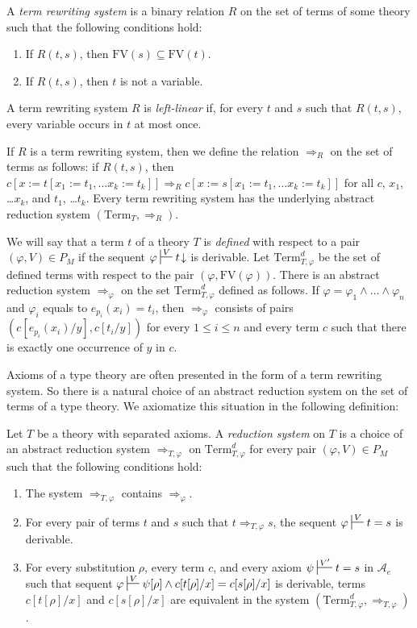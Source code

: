 \documentclass[reqno]{amsart}
\theoremstyle{definition}
\theoremstyle{remark}
\newcommand{\repl}{:=}
\newcommand{\Term}{\mathrm{Term}}
\newcommand{\FV}{\mathrm{FV}}
\numberwithin{figure}{section}
\begin{document}
A \emph{term rewriting system} is a binary relation $R$ on the set of terms of some theory such that the following conditions hold:
\begin{enumerate}
\item If $R(t,s)$, then $\FV(s) \subseteq \FV(t)$.
\item If $R(t,s)$, then $t$ is not a variable.
\end{enumerate}
A term rewriting system $R$ is \emph{left-linear} if, for every $t$ and $s$ such that $R(t,s)$, every variable occurs in $t$ at most once.

If $R$ is a term rewriting system, then we define the relation $\Rightarrow_R$ on the set of terms as follows:
if $R(t,s)$, then $c[x \repl t[x_1 \repl t_1, \ldots x_k \repl t_k]] \Rightarrow_R c[x \repl s[x_1 \repl t_1, \ldots x_k \repl t_k]]$ for all $c$, $x_1$, \ldots $x_k$, and $t_1$, \ldots $t_k$.
Every term rewriting system has the underlying abstract reduction system $(\Term_T,\Rightarrow_R)$.

We will say that a term $t$ of a theory $T$ is \emph{defined} with respect to a pair $(\varphi,V) \in P_M$ if the sequent $\varphi \sststile{}{V} t\!\downarrow$ is derivable.
Let $\Term_{T,\varphi}^d$ be the set of defined terms with respect to the pair $(\varphi,\FV(\varphi))$.
There is an abstract reduction system $\Rightarrow_\varphi$ on the set $\Term_{T,\varphi}^d$ defined as follows.
If $\varphi = \varphi_1 \land \ldots \land \varphi_n$ and $\varphi_i$ equals to $e_{p_i}(x_i) = t_i$, then $\Rightarrow_\varphi$ consists of pairs $(c[e_{p_i}(x_i)/y],c[t_i/y])$
for every $1 \leq i \leq n$ and every term $c$ such that there is exactly one occurrence of $y$ in $c$.

Axioms of a type theory are often presented in the form of a term rewriting system.
So there is a natural choice of an abstract reduction system on the set of terms of a type theory.
We axiomatize this situation in the following definition:

\begin{defn}[directed]
Let $T$ be a theory with separated axioms.
A \emph{reduction system} on $T$ is a choice of an abstract reduction system $\Rightarrow_{T,\varphi}$ on $\Term^d_{T,\varphi}$ for every pair $(\varphi,V) \in P_M$ such that the following conditions hold:
\begin{enumerate}
\item \label{it:dir-zero} The system $\Rightarrow_{T,\varphi}$ contains $\Rightarrow_\varphi$.
\item \label{it:dir-first} For every pair of terms $t$ and $s$ such that $t \Rightarrow_{T,\varphi} s$, the sequent $\varphi \sststile{}{V} t = s$ is derivable.
\item \label{it:dir-second} For every substitution $\rho$, every term $c$, and every axiom $\psi \sststile{}{V'} t = s$ in $\mathcal{A}_e$
such that sequent $\varphi \sststile{}{V} \psi[\rho] \land c[t[\rho]/x] = c[s[\rho]/x]$ is derivable,
terms $c[t[\rho]/x]$ and $c[s[\rho]/x]$ are equivalent in the system $(\Term_{T,\varphi}^d,\Rightarrow_{T,\varphi})$.
\end{enumerate}
\end{defn}
\end{document}
